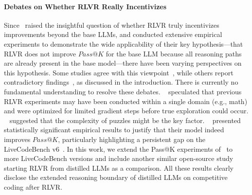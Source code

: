\paragraph{Debates on Whether RLVR Really Incentivizes}
Since~\citet{yue2025RLVR_limit} raised the insightful question of whether RLVR truly incentivizes improvements beyond the base LLMs, and conducted extensive empirical experiments to demonstrate the wide applicability of their key hypothesis—that RLVR does not improve $Pass@K$ for the base LLM because all reasoning paths are already present in the base model—there have been varying perspectives on this hypothesis.
Some studies agree with this viewpoint~\citep{wang2025OneShotRLVR,zhu2025PosNegRLVR,zhang2025EMPO,wang2025MultimodalCoTRM,chen2025NFT}, while others report contradictory findings~\citep{liu2025ProRL,chen2025AceReason-Nemotron,Shojaee2025IllusionOfThink}, as discussed in the introduction.
There is currently no fundamental understanding to resolve these debates.
~\citet{liu2025ProRL} speculated that previous RLVR experiments may have been conducted within a single domain (e.g., math) and were optimized for limited gradient steps before true exploration could occur. 
~\citet{Shojaee2025IllusionOfThink} suggested that the complexity of puzzles might be the key factor. 
~\citet{chen2025AceReason-Nemotron} presented statistically significant empirical results to justify that their model indeed improves $Pass@K$, particularly highlighting a persistent gap on the LiveCodeBench v6~\citep{Jain2025LiveCodeBench}.
In this work, we extend the Pass@K experiments of~\citet{chen2025AceReason-Nemotron} to more LiveCodeBench versions and include another similar open-source study~\citep{he2025Skywork-OR1} starting RLVR from distilled LLMs as a comparison.
All these results clearly disclose the extended reasoning boundary of distilled LLMs on competitive coding after RLVR.




